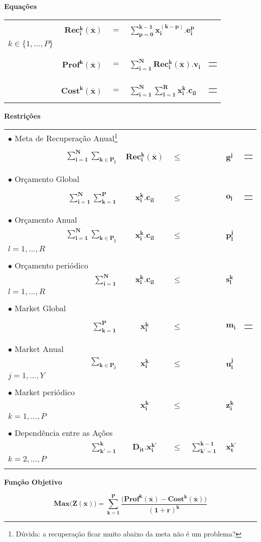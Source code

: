 \documentclass{article}
\newcommand{\topico}[1]{
  \vspace{20pt}
  {\Large \bf #1 }
}
\newenvironment{restricoes}
  { \begin{longtable}{lrcclll}}
  {\end{longtable} }
\newcommand{\restricao}[7]{
    \multicolumn{2}{l}{ $\bullet$ #1} & & \\ \nopagebreak
    & ${ \displaystyle \bm{#2} }$
    & ${ \bm{#3} }$
    & ${ \bm{#4} }$
    & ${ \displaystyle \bm{#5} }$
    & ${ \bm{#6} }$
	& \begin{tabular}{l}
	  #7
    \end{tabular}
	\\ \hspace{30pt}
}
\newenvironment{equacoes}
	{ \begin{longtable}{lrcll} }
	{ \end{longtable} }
\newcommand{\equacao}[4]{
    \multicolumn{5}{l}{\text{ \parbox{250pt}{$\bullet$ #1} }} \\   %
    \phantom{aaaaaa} & $ \displaystyle \bm{#2} $                              %
    & $ = $                 
	& $\displaystyle \bm{#3} $                           %
	&
	\begin{tabular}{l}
	  #4                                 %
	\end{tabular}
	\vspace{12pt}
	\\
}
\begin{document}
\topico{Equações}

\begin{equacoes}
    \equacao
	  {Recuperação de energia para o período $k$ causada pelas as ações $i$ de todos os períodos.}
	  {Rec_{i}^{k}(\overline{x})}
	  {\sum_{p = 0}^{k-1} x_i^{(k-p)} . e_i^{p}}
	  { $i \in \{1, \ldots, N\}$ \\ $k \in \{1, \ldots, P\}$ }
	\equacao
	  {Lucro originado pela energia recuperada no período $k$.}
	  {Prof^k(\overline{x})}
	  {\sum_{i=1}^N Rec_{i}^k(\overline{x}) . v_i}
	  { $k \in \{1, \ldots, P\}$}
	\equacao
	  {Custo total de todas as ações executadas no período $k$.}
	  {Cost^k(\overline{x})}
	  {\sum_{i=1}^N \sum_{l=1}^R x_i^k . c_{il}}
	  { $k \in \{1, \ldots, P\}$}
\end{equacoes}

\topico{Restrições}

\begin{restricoes}
    \restricao
	  {Meta de Recuperação Anual\footnote{Dúvida: a recuperação ficar muito abaixo da meta não é um problema?}}
	  { \sum_{i = 1}^N \sum_{k \in P_j}}
	  { Rec_i^k(\overline{x})}
	  { \leq }
	  { }
	  { g^j }
	  { $ j = 1, \ldots, Y $ }
	\\
    \restricao
	  {Orçamento Global}
	  { \sum_{i = 1}^N \sum_{k = 1}^P }
	  { x_i^k . c_{il}}
	  { \leq }
	  { }
	  { o_l }
	  { $ l = 1, \ldots, R $ }
	\\
    \restricao
      {Orçamento Anual}
      { \sum_{i = 1}^N \sum_{k \in P_j} }
      { x_i^k . c_{il} }
	  { \leq }
	  { }
	  { p_l^j }
	  { $ j = 1, \ldots, Y $ \\ $ l = 1, \ldots, R$ }
    \\
	\restricao
	  {Orçamento periódico}
      { \sum_{i = 1}^N }
      { x_i^k . c_{il} }
	  { \leq }
	  { }
	  { s_l^{k} }
	  { $ k = 1, \ldots, P $ \\ $ l = 1, \ldots, R $ }
	\\
	\restricao
	  {Market Global}
      { \sum_{k = 1}^P }
      { x_i^k }
	  { \leq }
	  { }
	  { m_i }
	  { $ i = 1, \ldots, N $ }
	\\
	\restricao
	  {Market Anual}
      { \sum_{k \in P_j} }
      { x_i^k }
	  { \leq }
	  { }
	  { u_i^j }
	  { $ i = 1, \ldots, N $ \\ $ j = 1, \ldots, Y $ }
	\\
	\restricao
	  {Market periódico}
      { }
      { x_i^k }
	  { \leq }
	  { }
	  { z_i^k }
	  { $ i = 1, \ldots, N $ \\ $ k = 1, \ldots, P$ }
	\\
	\restricao
	  {Dependência entre as Ações}
      { \sum_{k' = 1}^k }
      { D_{it} . x_i^{k'} }
	  { \leq }
	  { \sum_{k' = 1 }^{k-1} }
	  { x_t^{k'} }
	  { $i,t=1,\ldots,N$ \\ $k=2,\ldots,P$ }
\end{restricoes}

\topico{Função Objetivo}
\begin{equation}
  \nonumber
    \bm{
	  Max \big(Z(\overline{x})\big) =
	    \sum_{k=1}^P
	    \frac
		  {\big( Prof^k(\overline{x}) - Cost^k(\overline{x}) \big)}
	      {(1+r)^k}
	}
  \label{eq:budget}
\end{equation}

\vfill
\end{document}

